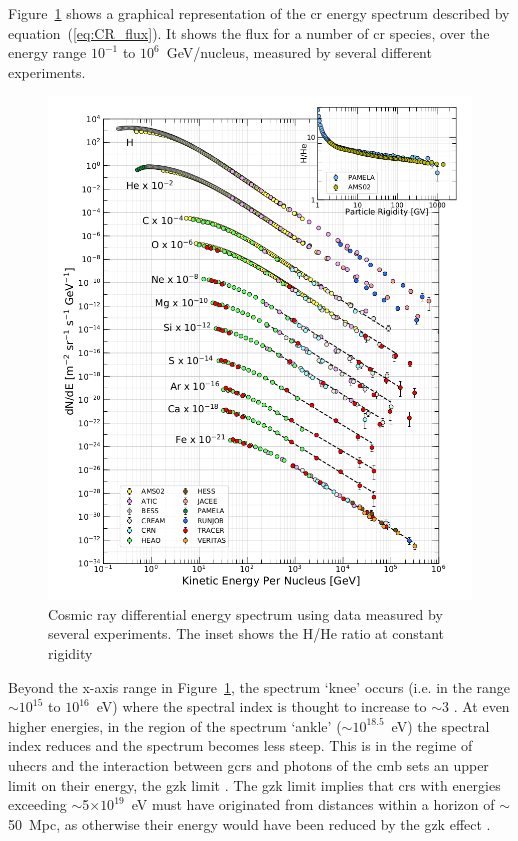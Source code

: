 Figure~\ref{fig:CR_spec} shows a graphical representation of the \gls{cr} energy spectrum described by equation~(\ref{eq:CR_flux}). It shows the flux for a number of \gls{cr} species, over the energy range $10^{-1}$ to $10^{6}$~GeV/nucleus, measured by several different experiments.

\begin{figure}[ht!]
	\centering
	\includegraphics[width=0.8\columnwidth]{CR_spectrum.png}
	\caption{ Cosmic ray differential energy spectrum using data measured by several experiments. The inset shows the H/He ratio at constant rigidity \citep{particle_data_group_review_2020} }
	\label{fig:CR_spec}
\end{figure}

Beyond the x-axis range in Figure~\ref{fig:CR_spec}, the spectrum `knee' occurs (i.e. in the range $\sim$$10^{15}$ to $10^{16}$~eV) where the spectral index is thought to increase to $\sim$3 \citep{particle_data_group_review_2020}. At even higher energies, in the region of the spectrum `ankle' ($\sim$$10^{18.5}$~eV) the spectral index reduces and the spectrum becomes less steep. This is in the regime of \glspl{uhecr} and the interaction between \glspl{gcr} and photons of the \gls{cmb} sets an upper limit on their energy, the \gls{gzk} limit \citep{particle_data_group_review_2020}. The \gls{gzk} limit implies that \glspl{cr} with energies exceeding $\sim$5$\times10^{19}$~eV must have originated from distances within a horizon of $\sim$50~Mpc, as otherwise their energy would have been reduced by the \gls{gzk} effect \citep{particle_data_group_review_2020}. 


